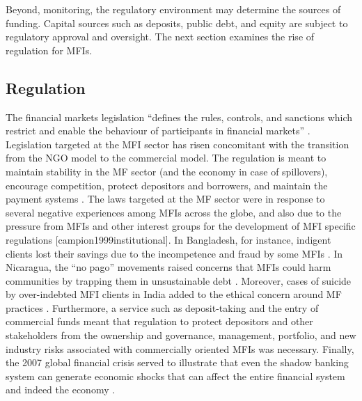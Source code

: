 \documentclass[a4paper, nobind]{templates/ociamthesis}
\begin{document}
Beyond, monitoring, the regulatory environment may determine the sources of funding. Capital sources such as deposits, public debt, and equity are subject to regulatory approval and oversight. The next section examines the rise of regulation for MFIs.

\hypertarget{regulation}{%
\subsection{Regulation}\label{regulation}}

\noindent The financial markets legislation ``defines the rules, controls, and sanctions which restrict and enable the behaviour of participants in financial markets'' \autocite{marti2016financial}. Legislation targeted at the MFI sector has risen concomitant with the transition from the NGO model to the commercial model. The regulation is meant to maintain stability in the MF sector (and the economy in case of spillovers), encourage competition, protect depositors and borrowers, and maintain the payment systems \autocite{johnson2013microfinance}. The laws targeted at the MF sector were in response to several negative experiences among MFIs across the globe, and also due to the pressure from MFIs and other interest groups for the development of MFI specific regulations {[}campion1999institutional{]}.
In Bangladesh, for instance, indigent clients lost their savings due to the incompetence and fraud by some MFIs \autocite{paprocki2016selling}. In Nicaragua, the ``no pago'' movements raised concerns that MFIs could harm communities by trapping them in unsustainable debt \autocite{bastiaensen2013after}. Moreover, cases of suicide by over-indebted MFI clients in India added to the ethical concern around MF practices \autocite{roodman2012due}. Furthermore, a service such as deposit-taking and the entry of commercial funds meant that regulation to protect depositors and other stakeholders from the ownership and governance, management, portfolio, and new industry risks associated with commercially oriented MFIs \autocite{meagher2006microfinance} was necessary. Finally, the 2007 global financial crisis served to illustrate that even the shadow banking system can generate economic shocks that can affect the entire financial system and indeed the economy \autocite{meeks2013shadow}.
\end{document}
